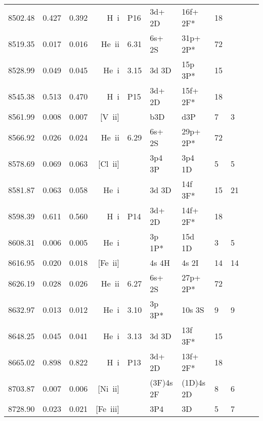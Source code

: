 \begin{longtable}{lrlrlllllll}
 8502.48 &   0.427 &   0.392 & H~{\sc i}        & P16        & 3d+ 2D     & 16f+ 2F*   &         18 &             \\
 8519.35 &   0.017 &   0.016 & He~{\sc ii}      & 6.31       & 6s+ 2S     & 31p+ 2P*   &         72 &             \\
 8528.99 &   0.049 &   0.045 & He~{\sc i}       & 3.15       & 3d 3D      & 15p 3P*    &         15 &             \\
 8545.38 &   0.513 &   0.470 & H~{\sc i}        & P15        & 3d+ 2D     & 15f+ 2F*   &         18 &             \\
 8561.99 &   0.008 &   0.007 & [V~{\sc ii}]     &            &  b3D       & d3P        &          7 &        3    \\
 8566.92 &   0.026 &   0.024 & He~{\sc ii}      & 6.29       & 6s+ 2S     & 29p+ 2P*   &         72 &             \\
 8578.69 &   0.069 &   0.063 & [Cl~{\sc ii}]    &            & 3p4 3P     & 3p4 1D     &          5 &        5    \\
 8581.87 &   0.063 &   0.058 & He~{\sc i}       &            & 3d  3D     & 14f  3F*   &         15 &       21    \\
 8598.39 &   0.611 &   0.560 & H~{\sc i}        & P14        & 3d+ 2D     & 14f+ 2F*   &         18 &             \\
 8608.31 &   0.006 &   0.005 & He~{\sc i}       &            & 3p  1P*    & 15d 1D     &          3 &        5    \\
 8616.95 &   0.020 &   0.018 & [Fe~{\sc ii}]    &            & 4s 4H      & 4s 2I      &         14 &       14    \\
 8626.19 &   0.028 &   0.026 & He~{\sc ii}      & 6.27       & 6s+ 2S     & 27p+ 2P*   &         72 &             \\
 8632.97 &   0.013 &   0.012 & He~{\sc i}       & 3.10       & 3p 3P*     & 10s 3S     &          9 &        9    \\
 8648.25 &   0.045 &   0.041 & He~{\sc i}       & 3.13       & 3d 3D      & 13f 3F*    &         15 &             \\
 8665.02 &   0.898 &   0.822 & H~{\sc i}        & P13        & 3d+ 2D     & 13f+ 2F*   &         18 &             \\
 8703.87 &   0.007 &   0.006 & [Ni~{\sc ii}]    &            & (3F)4s 2F  & (1D)4s 2D  &          8 &        6    \\
 8728.90 &   0.023 &   0.021 & [Fe~{\sc iii}]   &            & 3P4        & 3D         &          5 &        7    \\

\end{longtable}
